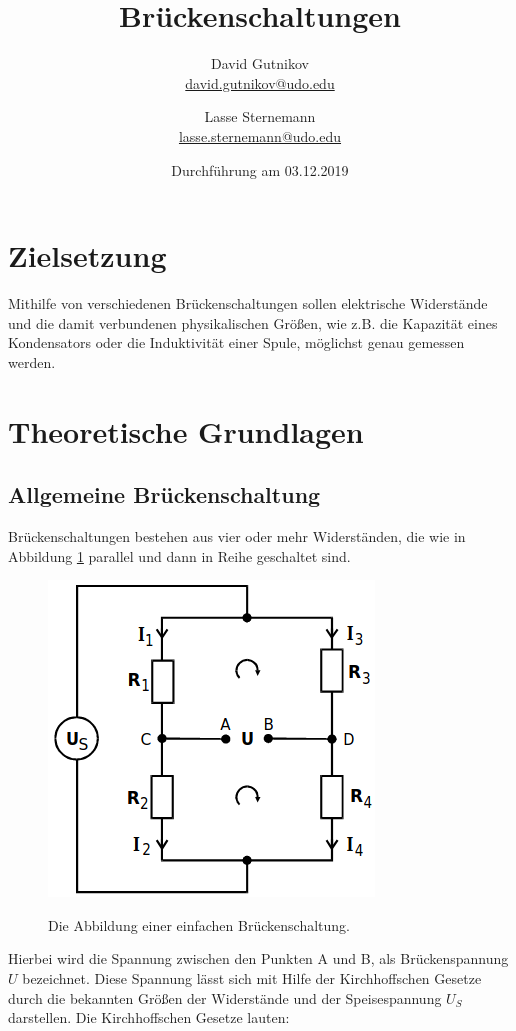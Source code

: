 \documentclass[titlepage = firstcover]{scrartcl}
\title{Brückenschaltungen}
\author{
  David Gutnikov\\
  \href{mailto:david.gutnikov@udo.edu}{david.gutnikov@udo.edu}
 \and 
  Lasse Sternemann\\
  \href{mailto:lasse.sternemann@udo.edu}{lasse.sternemann@udo.edu}
}
\date{Durchführung am 03.12.2019}
\begin{document}
    \maketitle
    \tableofcontents
    \newpage

    \section{Zielsetzung}
        Mithilfe von verschiedenen Brückenschaltungen sollen elektrische Widerstände und die damit verbundenen physikalischen Größen, wie z.B. die Kapazität
        eines Kondensators oder die Induktivität einer Spule, möglichst genau gemessen werden.



    \section{Theoretische Grundlagen}
        \subsection{Allgemeine Brückenschaltung}
          Brückenschaltungen bestehen aus vier oder mehr Widerständen, die wie in Abbildung \ref{fig:brueckenschalt} parallel und dann in Reihe geschaltet
          sind.
          \begin{figure}[h]
            \centering
            \caption{Die Abbildung einer einfachen Brückenschaltung.}
            \includegraphics[width = 0.4\linewidth]{Brueckenschaltung.png}
            \label{fig:brueckenschalt}
          \end{figure}
      
          \FloatBarrier
          \noindent
          Hierbei wird die Spannung zwischen den Punkten A und B, als Brückenspannung $U$ bezeichnet. Diese Spannung lässt sich mit Hilfe der Kirchhoffschen
          Gesetze durch die bekannten Größen der Widerstände und der Speisespannung $U_S$ darstellen.
          Die Kirchhoffschen Gesetze lauten:
\end{document}
